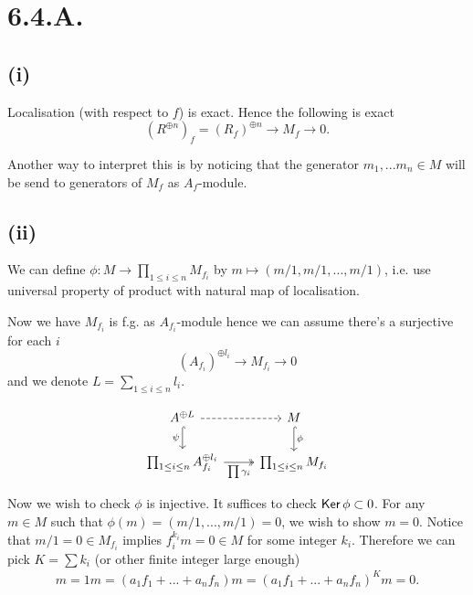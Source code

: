 \section{6.4.A.}

\subsection{(i)} Localisation (with respect to $f$) is exact. Hence the following is exact
\[(R^{\oplus n})_f=(R_f)^{\oplus n}\to M_f\to 0.\]

Another way to interpret this is by noticing that the generator $m_1,...m_n\in M$ will be send to generators of $M_f$ as $A_f$-module.

\subsection{(ii)} We can define $\phi: M\to \prod_{1\leq i\leq n}M_{f_i}$ by $m\mapsto (m/1,m/1,...,m/1)$, i.e. use universal property of product with natural map of localisation. 

Now we have $M_{f_i}$ is f.g. as $A_{f_i}$-module hence we can assume there's a surjective for each $i$ 
\[(A_{f_i})^{\oplus l_i}\to M_{f_i}\to 0\] and we denote $L=\sum_{1\leq i\leq n} l_i$. 

\[\begin{tikzcd}
	{A^{\oplus L}} & M \\
	{\prod_{1\leq i\leq n}A_{f_i}^{\oplus l_i}} & {\prod_{1\leq i\leq n}M_{f_i}}
	\arrow[dashed, from=1-1, to=1-2]
	\arrow["\psi"', hook, from=1-1, to=2-1]
	\arrow["\phi", hook, from=1-2, to=2-2]
	\arrow["{\prod \gamma_i}"', two heads, from=2-1, to=2-2]
\end{tikzcd}\]

Now we wish to check $\phi$ is injective. It suffices to check $\operatorname{\mathsf{Ker}} \phi\subset 0$. For any $m\in M$ such that $\phi(m)=(m/1,...,m/1)=0$, we wish to show $m=0$. Notice that $m/1=0\in M_{f_i}$ implies $f_i^{k_i}m=0\in M$ for some integer $k_i$. Therefore we can pick $K=\sum k_i$ (or other finite integer large enough)
\begin{align*}
    m=1m=(a_1f_1+...+a_nf_n)m=(a_1f_1+...+a_nf_n)^{K}m=0.
\end{align*}

